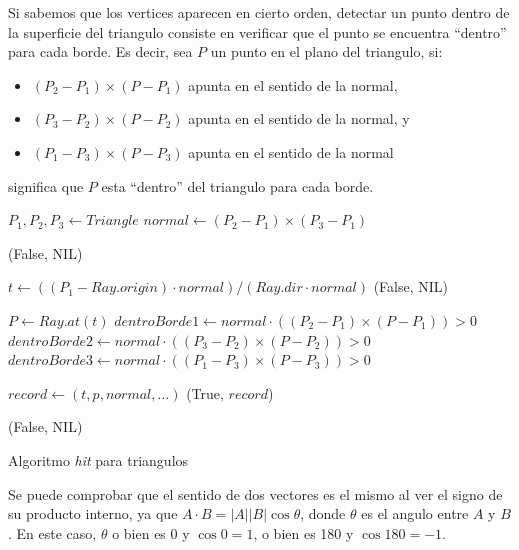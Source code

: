 Si sabemos que los vertices aparecen en cierto orden, detectar un punto dentro de
la superficie del triangulo consiste en verificar que el punto se encuentra ``dentro''
para cada borde. Es decir, sea $P$ un punto en el plano del triangulo, si:

\begin{itemize}
    \item $(P_2 - P_1) \times (P - P_1)$ apunta en el sentido de la normal,
    \item $(P_3 - P_2) \times (P - P_2)$ apunta en el sentido de la normal, y
    \item $(P_1 - P_3) \times (P - P_3)$ apunta en el sentido de la normal
\end{itemize}

significa que $P$ esta ``dentro'' del triangulo para cada borde.

\begin{algorithm}[H]
\begin{algorithmic}[1]
    \State $P_1, P_2, P_3 \gets Triangle$ 
    \State $normal \gets (P_2 - P_1) \times (P_3 - P_1)$
    
        \State \Return (False, NIL) 
    \EndIf

    \State $t \gets ((P_1 - Ray.origin) \cdot normal) / (Ray.dir \cdot normal)$
        \State \Return (False, NIL)
    \EndIf

    \State $P \gets Ray.at(t)$ 
    \State $dentroBorde1 \gets normal \cdot ((P_2 - P_1) \times (P - P_1)) > 0$
    \State $dentroBorde2 \gets normal \cdot ((P_3 - P_2) \times (P - P_2)) > 0$
    \State $dentroBorde3 \gets normal \cdot ((P_1 - P_3) \times (P - P_3)) > 0$


        \State $record \gets (t, p, normal, \dots)$
        \State \Return (True, $record$)
    \EndIf

    \State \Return (False, NIL)
\EndFunction
\end{algorithmic}
\caption{Algoritmo \textit{hit} para triangulos}
\label{alg:triangle-hit}
\end{algorithm}

Se puede comprobar que el sentido de dos vectores es el mismo al ver el signo de
su producto interno, ya que $A \cdot B = \vert A \vert \vert B \vert
\cos{\theta}$, donde $\theta$ es el angulo entre $A$ y $B$. En este caso,
$\theta$ o bien es 0 y $\cos{0} = 1$, o bien es 180 y $\cos{180}=-1$.

